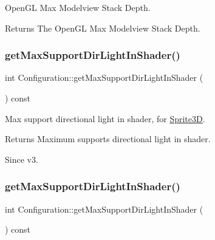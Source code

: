 Open\+GL Max Modelview Stack Depth.

\begin{DoxyReturn}{Returns}
The Open\+GL Max Modelview Stack Depth. 
\end{DoxyReturn}
\mbox{\label{classConfiguration_a4ab4373afd4bca790279ef1c907b17cb}} 
\subsubsection{\texorpdfstring{get\+Max\+Support\+Dir\+Light\+In\+Shader()}{getMaxSupportDirLightInShader()}\hspace{0.1cm}{\footnotesize\ttfamily [1/2]}}
{\footnotesize\ttfamily int Configuration\+::get\+Max\+Support\+Dir\+Light\+In\+Shader (\begin{DoxyParamCaption}{ }\end{DoxyParamCaption}) const}

Max support directional light in shader, for \hyperlink{classSprite3D}{Sprite3D}.

\begin{DoxyReturn}{Returns}
Maximum supports directional light in shader. 
\end{DoxyReturn}
\begin{DoxySince}{Since}
v3. 
\end{DoxySince}
\mbox{\label{classConfiguration_a4ab4373afd4bca790279ef1c907b17cb}} 
\subsubsection{\texorpdfstring{get\+Max\+Support\+Dir\+Light\+In\+Shader()}{getMaxSupportDirLightInShader()}\hspace{0.1cm}{\footnotesize\ttfamily [2/2]}}
{\footnotesize\ttfamily int Configuration\+::get\+Max\+Support\+Dir\+Light\+In\+Shader (\begin{DoxyParamCaption}{ }\end{DoxyParamCaption}) const}

